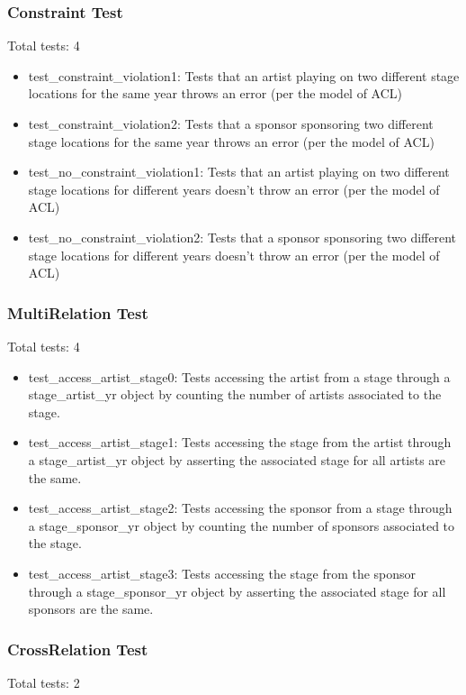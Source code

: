 \documentclass[12pt,english]{scrartcl}
\begin{document}
\subsubsection{Constraint Test}
Total tests: 4 \\
\begin{itemize}
 \item test\_constraint\_violation1: Tests that an artist playing on two different stage locations for the same year throws an error (per the model of ACL)
 \item test\_constraint\_violation2: Tests that a sponsor sponsoring two different stage locations for the same year throws an error (per the model of ACL)
 \item test\_no\_constraint\_violation1: Tests that an artist playing on two different stage locations for different years doesn't throw an error (per the model of ACL)
 \item test\_no\_constraint\_violation2: Tests that a sponsor sponsoring two different stage locations for different years doesn't throw an error (per the model of ACL)
\end{itemize}


\subsubsection{MultiRelation Test} 
Total tests: 4 \\

\begin{itemize}
 \item test\_access\_artist\_stage0: Tests accessing the artist from a stage through a stage\_artist\_yr object by counting the number of artists associated to the stage.
 \item test\_access\_artist\_stage1: Tests accessing the stage from the artist through a stage\_artist\_yr object by asserting the associated stage for all artists are the same.
 \item test\_access\_artist\_stage2: Tests accessing the sponsor from a stage through a stage\_sponsor\_yr object by counting the number of sponsors associated to the stage.
 \item test\_access\_artist\_stage3: Tests accessing the stage from the sponsor through a stage\_sponsor\_yr object by asserting the associated stage for all sponsors are the same.
\end{itemize}


\subsubsection{CrossRelation Test}
Total tests: 2 \\
\end{document}
